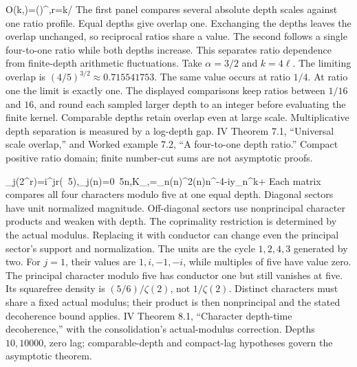 {\mathcal O(k,\ell)=\longrightarrow\left(\right)^\alpha,\qquad r=k/\ell}
{The first panel compares several absolute depth scales against one ratio profile. Equal depths give overlap one. Exchanging the depths leaves the overlap unchanged, so reciprocal ratios share a value. The second follows a single four-to-one ratio while both depths increase. This separates ratio dependence from finite-depth arithmetic fluctuations.}
{Take $\alpha=3/2$ and $k=4\ell$. The limiting overlap is $(4/5)^{3/2}\approx0.715541753$. The same value occurs at ratio $1/4$. At ratio one the limit is exactly one. The displayed comparisons keep ratios between $1/16$ and $16$, and round each sampled larger depth to an integer before evaluating the finite kernel.}
{Comparable depths retain overlap even at large scale. Multiplicative depth separation is measured by a log-depth gap.}
{IV Theorem 7.1, ``Universal scale overlap,'' and Worked example 7.2, ``A four-to-one depth ratio.'' Compact positive ratio domain; finite number-cut sums are not asymptotic proofs.}

{\chi_j(2^r)=i^{jr}\quad(\bmod\ 5),\qquad\chi_j(n)=0\ 5\mid n,\qquad K_{\chi,\psi}=\sum_n\mu(n)^2\chi(n)n^{-4-i\tau}y_n^{k+\ell}}
{Each matrix compares all four characters modulo five at one equal depth. Diagonal sectors have unit normalized magnitude. Off-diagonal sectors use nonprincipal character products and weaken with depth. The coprimality restriction is determined by the actual modulus. Replacing it with conductor can change even the principal sector's support and normalization.}
{The units are the cycle $1,2,4,3$ generated by two. For $j=1$, their values are $1,i,-1,-i$, while multiples of five have value zero. The principal character modulo five has conductor one but still vanishes at five. Its squarefree density is $(5/6)/\zeta(2)$, not $1/\zeta(2)$.}
{Distinct characters must share a fixed actual modulus; their product is then nonprincipal and the stated decoherence bound applies.}
{IV Theorem 8.1, ``Character depth-time decoherence,'' with the consolidation's actual-modulus correction. Depths $10,10000$, zero lag; comparable-depth and compact-lag hypotheses govern the asymptotic theorem.}

